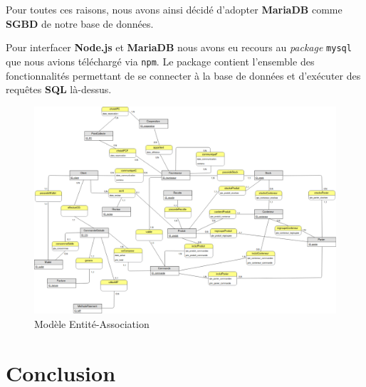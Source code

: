\documentclass[a4paper,12pt]{report}
\theoremstyle{break}
\theoremstyle{break}
\theoremstyle{break}
\theoremstyle{break}
\theoremstyle{definition}
\theoremstyle{remark}
\begin{document}
Pour toutes ces raisons, nous avons ainsi décidé d'adopter \textbf{MariaDB} comme \textbf{SGBD} de notre base de données.

Pour interfacer \textbf{Node.js} et \textbf{MariaDB} nous avons eu recours au \textit{package} \og \texttt{mysql} \fg que nous avions téléchargé via \texttt{npm}. Le package contient l'ensemble des fonctionnalités permettant de se connecter à la base de données et d'exécuter des requêtes \textbf{SQL} là-dessus.

\begin{figure}[!ht]
  \centering
  \includegraphics[scale=0.35]{images/er_model.png}
  \caption{Modèle Entité-Association}
  \label{fig:modele_EA}
\end{figure}

\newpage
\chapter{Conclusion}
\end{document}
